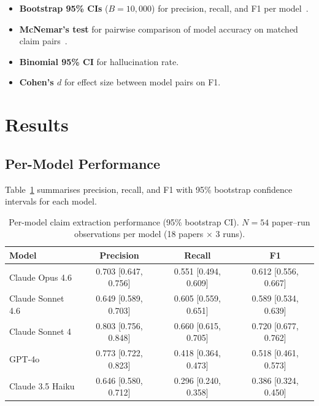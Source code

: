 \documentclass[11pt,a4paper]{article}
\begin{document}
\begin{itemize}
  \item \textbf{Bootstrap 95\% CIs} ($B = 10{,}000$) for precision,
        recall, and F1 per model~\citep{efron1993bootstrap}.
  \item \textbf{McNemar's test} for pairwise comparison of model accuracy
        on matched claim pairs~\citep{mcnemar1947note}.
  \item \textbf{Binomial 95\% CI} for hallucination rate.
  \item \textbf{Cohen's $d$} for effect size between model pairs on F1.
\end{itemize}

\section{Results}
\label{sec:results}

\subsection{Per-Model Performance}

Table~\ref{tab:per-model} summarises precision, recall, and F1 with 95\%
bootstrap confidence intervals for each model.

\begin{table}[ht]
\centering
\caption{Per-model claim extraction performance (95\% bootstrap CI).
  $N = 54$ paper--run observations per model (18 papers $\times$ 3 runs).}
\label{tab:per-model}
\begin{tabular}{lccc}
\toprule
\textbf{Model} & \textbf{Precision} & \textbf{Recall} & \textbf{F1} \\
\midrule
Claude Opus 4.6
  & 0.703 \scriptsize[0.647, 0.756]
  & 0.551 \scriptsize[0.494, 0.609]
  & 0.612 \scriptsize[0.556, 0.667] \\
Claude Sonnet 4.6
  & 0.649 \scriptsize[0.589, 0.703]
  & 0.605 \scriptsize[0.559, 0.651]
  & 0.589 \scriptsize[0.534, 0.639] \\
Claude Sonnet 4
  & 0.803 \scriptsize[0.756, 0.848]
  & 0.660 \scriptsize[0.615, 0.705]
  & 0.720 \scriptsize[0.677, 0.762] \\
GPT-4o
  & 0.773 \scriptsize[0.722, 0.823]
  & 0.418 \scriptsize[0.364, 0.473]
  & 0.518 \scriptsize[0.461, 0.573] \\
Claude 3.5 Haiku
  & 0.646 \scriptsize[0.580, 0.712]
  & 0.296 \scriptsize[0.240, 0.358]
  & 0.386 \scriptsize[0.324, 0.450] \\
\bottomrule
\end{tabular}
\end{table}
\end{document}
